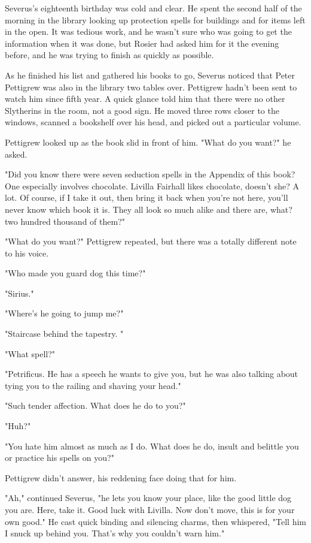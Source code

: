 Severus's eighteenth birthday was cold and clear. He spent the second half of the morning in the library looking up protection spells for buildings and for items left in the open. It was tedious work, and he wasn't sure who was going to get the information when it was done, but Rosier had asked him for it the evening before, and he was trying to finish as quickly as possible.

As he finished his list and gathered his books to go, Severus noticed that Peter Pettigrew was also in the library two tables over. Pettigrew hadn't been sent to watch him since fifth year. A quick glance told him that there were no other Slytherins in the room, not a good sign. He moved three rows closer to the windows, scanned a bookshelf over his head, and picked out a particular volume.

Pettigrew looked up as the book slid in front of him. "What do you want?" he asked.

"Did you know there were seven seduction spells in the Appendix of this book? One especially involves chocolate. Livilla Fairhall likes chocolate, doesn't she? A lot. Of course, if I take it out, then bring it back when you're not here, you'll never know which book it is. They all look so much alike and there are, what? two hundred thousand of them?"

"What do you want?" Pettigrew repeated, but there was a totally different note to his voice.

"Who made you guard dog this time?"

"Sirius."

"Where's he going to jump me?"

"Staircase behind the tapestry. "

"What spell?"

"Petrificus. He has a speech he wants to give you, but he was also talking about tying you to the railing and shaving your head."

"Such tender affection. What does he do to you?"

"Huh?"

"You hate him almost as much as I do. What does he do, insult and belittle you or practice his spells on you?"

Pettigrew didn't answer, his reddening face doing that for him.

"Ah," continued Severus, "he lets you know your place, like the good little dog you are. Here, take it. Good luck with Livilla. Now don't move, this is for your own good." He cast quick binding and silencing charms, then whispered, "Tell him I snuck up behind you. That's why you couldn't warn him."

